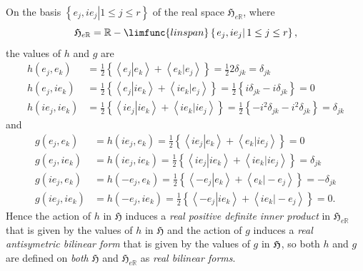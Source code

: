 \documentclass[aps,preprint]{revtex4}
\begin{document}
On the basis $\left\{ \left. e_{j},ie_{j}\right\vert 1\leq j\leq r\right\} $
of the real space $\mathfrak{H}_{e\mathbb{R}}$, where 
\begin{equation}
\mathfrak{H}_{e\mathbb{R}}=\mathbb{R}-\limfunc{linspan}\left\{ \left.
e_{j},ie_{j}\right\vert 1\leq j\leq r\right\} ,
\end{equation}%
the values of $h$ and $g$ are 
\begin{align}
h\left( e_{j},e_{k}\right) & =\frac{1}{2}\left\{ \left\langle \left.
e_{j}\right\vert e_{k}\right\rangle +\left\langle \left. e_{k}\right\vert
e_{j}\right\rangle \right\} =\frac{1}{2}2\delta _{jk}=\delta _{jk} \\
h\left( e_{j},ie_{k}\right) & =\frac{1}{2}\left\{ \left\langle \left.
e_{j}\right\vert ie_{k}\right\rangle +\left\langle \left. ie_{k}\right\vert
e_{j}\right\rangle \right\} =\frac{1}{2}\left\{ i\delta _{jk}-i\delta
_{jk}\right\} =0 \\
h\left( ie_{j},ie_{k}\right) & =\frac{1}{2}\left\{ \left\langle \left.
ie_{j}\right\vert ie_{k}\right\rangle +\left\langle \left. ie_{k}\right\vert
ie_{j}\right\rangle \right\} =\frac{1}{2}\left\{ -i^{2}\delta
_{jk}-i^{2}\delta _{jk}\right\} =\delta _{jk}
\end{align}%
and 
\begin{align}
g\left( e_{j},e_{k}\right) & =h\left( ie_{j},e_{k}\right) =\frac{1}{2}%
\left\{ \left\langle \left. ie_{j}\right\vert e_{k}\right\rangle
+\left\langle \left. e_{k}\right\vert ie_{j}\right\rangle \right\} =0 \\
g\left( e_{j},ie_{k}\right) & =h\left( ie_{j},ie_{k}\right) =\frac{1}{2}%
\left\{ \left\langle \left. ie_{j}\right\vert ie_{k}\right\rangle
+\left\langle \left. ie_{k}\right\vert ie_{j}\right\rangle \right\} =\delta
_{jk} \\
g\left( ie_{j},e_{k}\right) & =h\left( -e_{j},e_{k}\right) =\frac{1}{2}%
\left\{ \left\langle \left. -e_{j}\right\vert e_{k}\right\rangle
+\left\langle \left. e_{k}\right\vert -e_{j}\right\rangle \right\} =-\delta
_{jk} \\
g\left( ie_{j},ie_{k}\right) & =h\left( -e_{j},ie_{k}\right) =\frac{1}{2}%
\left\{ \left\langle \left. -e_{j}\right\vert ie_{k}\right\rangle
+\left\langle \left. ie_{k}\right\vert -e_{j}\right\rangle \right\} =0.
\end{align}%
Hence the action of $h$ in $\mathfrak{H}$ induces a \emph{real positive
definite inner product} in $\mathfrak{H}_{e\mathbb{R}}$ that is given by the
values of $h$ in $\mathfrak{H}$ and the action of $g$ induces a \emph{real
antisymetric bilinear form} that is given by the values of $g$ in $\mathfrak{%
H}$, so both $h$ and $g$ are defined on \emph{both} $\mathfrak{H}$ and $%
\mathfrak{H}_{e\mathbb{R}}$ as \emph{real bilinear forms}.
\end{document}
